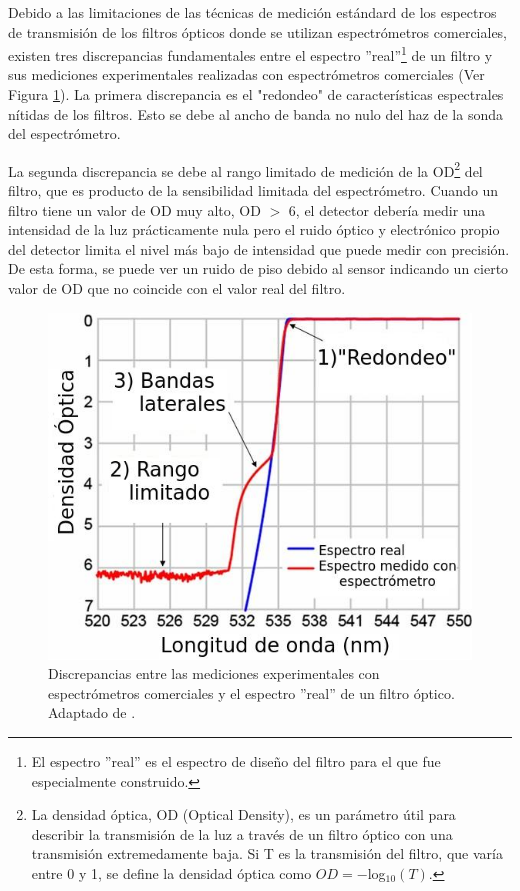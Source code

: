 Debido a las limitaciones de las técnicas de 
medición estándard 
de los espectros de transmisión de los filtros ópticos donde se utilizan 
espectrómetros comerciales, existen tres discrepancias fundamentales 
entre el espectro ''real''\footnote{El espectro ''real'' es 
	el espectro de diseño del filtro para el que fue especialmente construido.} 
	de 
un 
filtro y sus mediciones experimentales realizadas con 
espectrómetros comerciales (Ver Figura \ref{fig:obj1a})\cite{Semrock}. La 
primera discrepancia es el "redondeo" de características espectrales nítidas de 
los filtros. 
Esto se debe al ancho de banda no nulo del haz de la sonda del 
espectrómetro. 


La segunda discrepancia se debe al rango limitado de 
medición de la OD\footnote{La densidad óptica, OD (Optical Density), es un 
	parámetro útil para describir la transmisión de la luz a través de un 
	filtro 
	óptico con una transmisión extremedamente baja. Si T es la transmisión del 
	filtro, que varía entre 0 y 1, se define la densidad óptica como $OD = 
	-$log$_{10} (T)$.} del filtro, que es 
producto de la sensibilidad limitada del espectrómetro. Cuando un filtro 
tiene un valor de OD muy alto, OD $>$ 6, el detector debería medir una 
intensidad de la luz prácticamente nula pero el ruido óptico y electrónico 
propio del detector limita el nivel más bajo de intensidad que puede medir 
con precisión. De esta forma, se puede ver un ruido de piso debido al 
sensor indicando un cierto valor de OD que no coincide con el valor real 
del filtro.

\begin{figure}[H]
	\centering
	\includegraphics[scale=0.8]{Figs/plan_de_tesis/measurement_of_optical_filter.jpg}
	\caption{Discrepancias entre las mediciones experimentales con 
		espectrómetros 
		comerciales y el espectro ''real'' de un filtro óptico. Adaptado de 
		\cite{Semrock}.}
	\label{fig:obj1a}
\end{figure}


